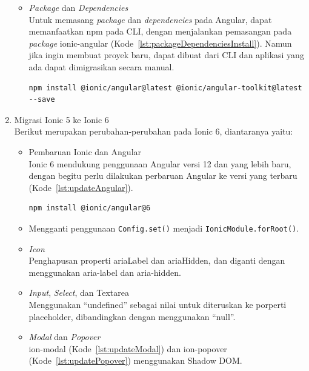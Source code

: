\begin{enumerate}
\begin{itemize}
		\item {\it Package} dan {\it Dependencies} \\
		Untuk memasang {\it package} dan {\it dependencies} pada Angular, dapat memanfaatkan npm pada CLI, dengan menjalankan pemasangan pada {\it package} ionic-angular  (Kode~\ref{lst:packageDependenciesInstall}). Namun jika ingin membuat proyek baru, dapat dibuat dari CLI dan aplikasi yang ada dapat dimigrasikan secara manual.
		\begin{lstlisting}[label={lst:packageDependenciesInstall}, caption=Kode untuk Memasang {\it Package} dan {\it Dependencies} pada Angular]
npm install @ionic/angular@latest @ionic/angular-toolkit@latest --save
		\end{lstlisting} 
	\end{itemize}
	\item Migrasi Ionic 5 ke Ionic 6 \\
	Berikut merupakan perubahan-perubahan pada Ionic 6, diantaranya yaitu:
	\begin{itemize}
		\item Pembaruan Ionic dan Angular \\
		Ionic 6 mendukung penggunaan Angular versi 12 dan yang lebih baru, dengan begitu perlu dilakukan perbaruan Angular ke versi yang terbaru (Kode~\ref{lst:updateAngular}).
		
\begin{lstlisting}[label={lst:updateAngular}, caption=Kode untuk Memperbarui Versi Ionic 6 dengan versi Angular Terbaru]
npm install @ionic/angular@6
\end{lstlisting} 

		\item Mengganti penggunaan \texttt{Config.set()} menjadi \texttt{IonicModule.forRoot()}.

		\item \textit{Icon} \\
		Penghapusan properti ariaLabel dan ariaHidden, dan diganti dengan menggunakan aria-label dan aria-hidden.
		\item \textit{Input}, \textit{Select}, dan Textarea \\
		Menggunakan ``undefined'' sebagai nilai untuk diteruskan ke porperti placeholder, dibandingkan dengan menggunakan ``null''.	
		
		\item \textit{Modal} dan \textit{Popover} \\
		ion-modal (Kode~\ref{lst:updateModal}) dan ion-popover (Kode~\ref{lst:updatePopover}) menggunakan Shadow DOM.
		

\end{itemize}
\end{enumerate}
